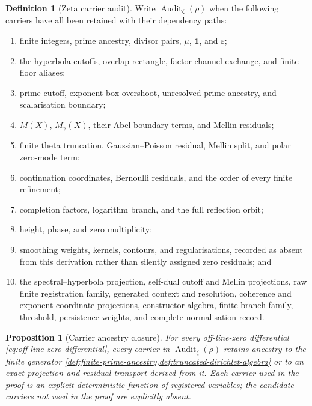 \documentclass[11pt,a4paper]{article}
\newtheorem{proposition}[theorem]{Proposition}
\theoremstyle{definition}
\newtheorem{definition}[theorem]{Definition}
\DeclareMathOperator{\Audit}{Audit}
\begin{document}
\begin{definition}[Zeta carrier audit]
\label{def:zeta-carrier-audit}
Write $\Audit_\zeta(\rho)$ when the following carriers have all been retained
with their dependency paths:
\begin{enumerate}[label=(\arabic*)]
  \item finite integers, prime ancestry, divisor pairs, $\mu$, $\mathbf1$, and
        $\varepsilon$;
  \item the hyperbola cutoffs, overlap rectangle, factor-channel exchange, and
        finite floor aliases;
  \item prime cutoff, exponent-box overshoot, unresolved-prime ancestry, and
        scalarisation boundary;
  \item $M(X)$, $M_\gamma(X)$, their Abel boundary terms, and Mellin residuals;
  \item finite theta truncation, Gaussian--Poisson residual, Mellin split, and
        polar zero-mode term;
  \item continuation coordinates, Bernoulli residuals, and the order of every
        finite refinement;
  \item completion factors, logarithm branch, and the full reflection orbit;
  \item height, phase, and zero multiplicity;
  \item smoothing weights, kernels, contours, and regularisations, recorded as
        absent from this derivation rather than silently assigned zero
        residuals; and
  \item the spectral--hyperbola projection, self-dual cutoff and Mellin
        projections, raw finite registration family, generated context and
        resolution, coherence and exponent-coordinate projections, constructor
        algebra, finite branch family, threshold, persistence weights, and
        complete normalisation record.
\end{enumerate}
\end{definition}

\begin{proposition}[Carrier ancestry closure]
\label{prop:zeta-carrier-ancestry}
For every off-line-zero differential
\cref{eq:off-line-zero-differential}, every carrier in
$\Audit_\zeta(\rho)$ retains ancestry to the finite generator
\cref{def:finite-prime-ancestry,def:truncated-dirichlet-algebra} or to an exact
projection and residual transport derived from it. Each carrier used in the
proof is an explicit deterministic function of registered variables; the
candidate carriers not used in the proof are explicitly absent.
\end{proposition}
\end{document}
